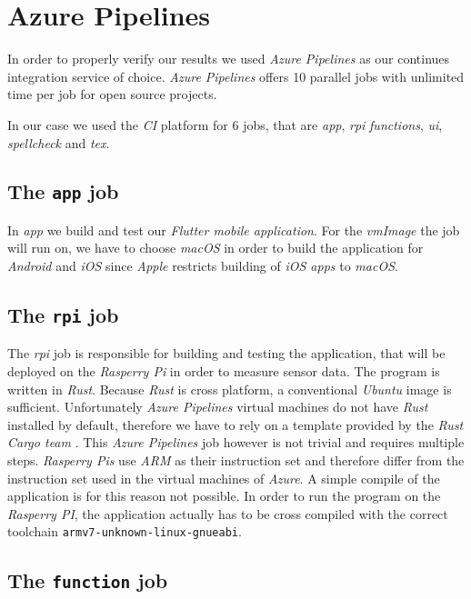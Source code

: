 \section{Azure Pipelines}

In order to properly verify our results we used \textit{Azure Pipelines} as our continues
integration service of choice. \textit{Azure Pipelines} offers 10 parallel jobs with unlimited time
per job for open source projects. \cite{azure-pipelines-devop}

In our case we used the \textit{CI} platform for 6 jobs, that are \textit{app}, \textit{rpi}
\textit{functions}, \textit{ui}, \textit{spellcheck} and \textit{tex}.

\subsection{The \texttt{app} job}

In \textit{app} we build and test our \textit{Flutter mobile application}. For the \textit{vmImage}
the job will run on, we have to choose \textit{macOS} in order to build the application for
\textit{Android} and \textit{iOS} since \textit{Apple} restricts building of \textit{iOS apps} to
\textit{macOS}.

\subsection{The \texttt{rpi} job}

The \textit{rpi} job is responsible for building and testing the application, that will be deployed
on the \textit{Rasperry Pi} in order to measure sensor data. The program is written in
\textit{Rust}. Because \textit{Rust} is cross platform, a conventional \textit{Ubuntu} image is
sufficient. Unfortunately \textit{Azure Pipelines} virtual machines do not have \textit{Rust}
installed by default, therefore we have to rely on a template provided by the \textit{Rust Cargo
team} \cite{rust-cargo}. This \textit{Azure Pipelines} job however is not trivial and requires
multiple steps. \textit{Rasperry Pis} use \textit{ARM} as their instruction set and therefore differ
from the instruction set used in the virtual machines of \textit{Azure}. A simple compile of the
application is for this reason not possible. In order to run the program on the \textit{Rasperry
PI}, the application actually has to be cross compiled with the correct toolchain
\texttt{armv7-unknown-linux-gnueabi}.

\subsection{The \texttt{function} job}
\label{sec:azure-function}

